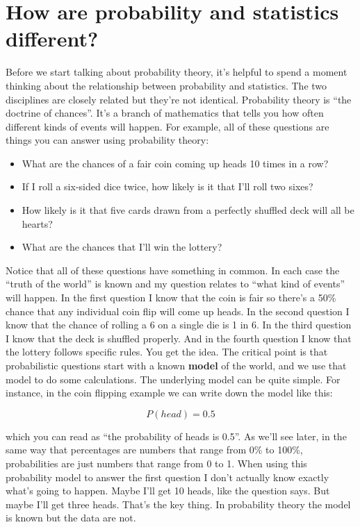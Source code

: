 \documentclass[
  a4paper,
]{book}
\providecommand{\tightlist}{%
  \setlength{\itemsep}{0pt}\setlength{\parskip}{0pt}}\usepackage{longtable,booktabs,array}
\begin{document}
\hypertarget{how-are-probability-and-statistics-different}{%
\section{How are probability and statistics
different?}\label{how-are-probability-and-statistics-different}}

Before we start talking about probability theory, it's helpful to spend
a moment thinking about the relationship between probability and
statistics. The two disciplines are closely related but they're not
identical. Probability theory is ``the doctrine of chances''. It's a
branch of mathematics that tells you how often different kinds of events
will happen. For example, all of these questions are things you can
answer using probability theory:

\begin{itemize}
\tightlist
\item
  What are the chances of a fair coin coming up heads 10 times in a row?
\item
  If I roll a six-sided dice twice, how likely is it that I'll roll two
  sixes?
\item
  How likely is it that five cards drawn from a perfectly shuffled deck
  will all be hearts?
\item
  What are the chances that I'll win the lottery?
\end{itemize}

Notice that all of these questions have something in common. In each
case the ``truth of the world'' is known and my question relates to
``what kind of events'' will happen. In the first question I know that
the coin is fair so there's a 50\% chance that any individual coin flip
will come up heads. In the second question I know that the chance of
rolling a 6 on a single die is 1 in 6. In the third question I know that
the deck is shuffled properly. And in the fourth question I know that
the lottery follows specific rules. You get the idea. The critical point
is that probabilistic questions start with a known \textbf{model} of the
world, and we use that model to do some calculations. The underlying
model can be quite simple. For instance, in the coin flipping example we
can write down the model like this:

\[P(head)=0.5\]

which you can read as ``the probability of heads is 0.5''. As we'll see
later, in the same way that percentages are numbers that range from 0\%
to 100\%, probabilities are just numbers that range from 0 to 1. When
using this probability model to answer the first question I don't
actually know exactly what's going to happen. Maybe I'll get 10 heads,
like the question says. But maybe I'll get three heads. That's the key
thing. In probability theory the model is known but the data are not.
\end{document}
